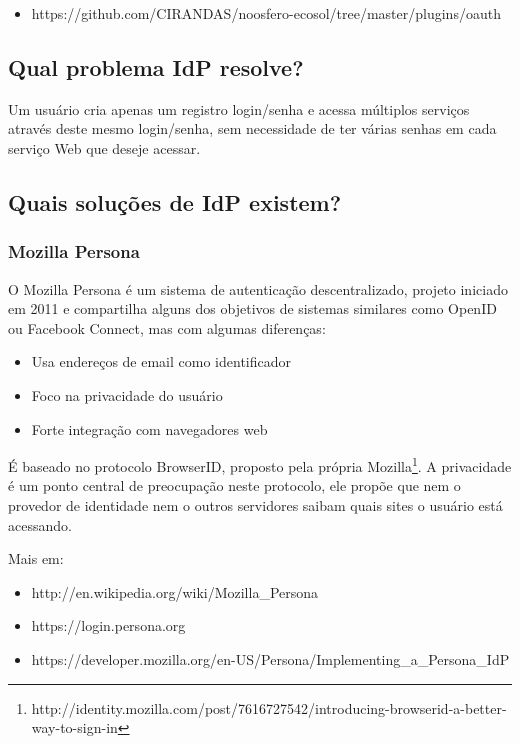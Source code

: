 \documentclass[11pt]{article}
\begin{document}
\begin{itemize}
  \item{https://github.com/CIRANDAS/noosfero-ecosol/tree/master/plugins/oauth}
\end{itemize}

\subsection{Qual problema IdP resolve?}

Um usuário cria apenas um registro login/senha e acessa múltiplos serviços
através deste mesmo login/senha, sem necessidade de ter várias senhas em cada
serviço Web que deseje acessar.

\subsection{Quais soluções de IdP existem?}

\subsubsection{Mozilla Persona}

O Mozilla Persona é um sistema de autenticação descentralizado, projeto
iniciado em 2011 e compartilha alguns dos objetivos de sistemas similares como
OpenID ou Facebook Connect, mas com algumas diferenças:

\begin{itemize}
  \item{Usa endereços de email como identificador}
  \item{Foco na privacidade do usuário}
  \item{Forte integração com navegadores web}
\end{itemize}

É baseado no protocolo BrowserID, proposto pela própria
Mozilla\footnote{http://identity.mozilla.com/post/7616727542/introducing-browserid-a-better-way-to-sign-in}.
A privacidade é um ponto central de preocupação neste protocolo, ele propõe que
nem o provedor de identidade nem o outros servidores saibam quais sites o
usuário está acessando.

Mais em:
\begin{itemize}
  \item{http://en.wikipedia.org/wiki/Mozilla\_Persona}
  \item{https://login.persona.org}
  \item{https://developer.mozilla.org/en-US/Persona/Implementing\_a\_Persona\_IdP}
\end{itemize}
\end{document}
